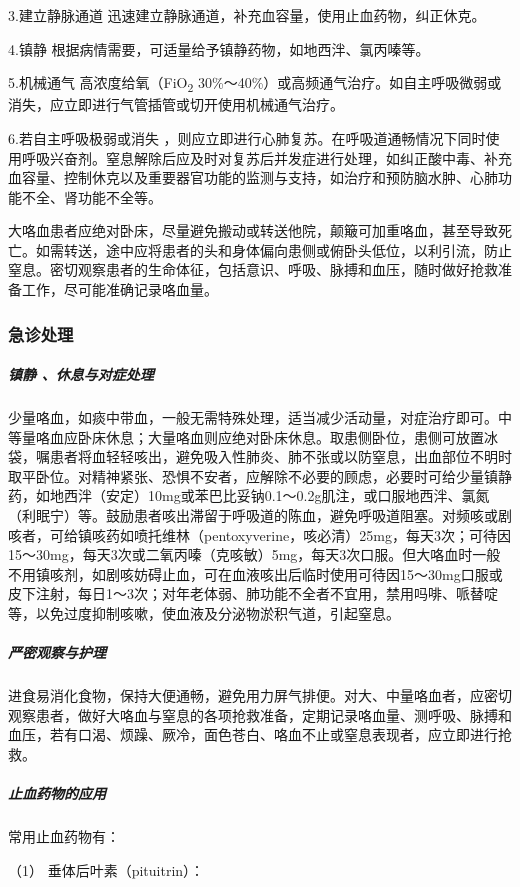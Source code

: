 3.建立静脉通道 迅速建立静脉通道，补充血容量，使用止血药物，纠正休克。

4.镇静 根据病情需要，可适量给予镇静药物，如地西泮、氯丙嗪等。

5.机械通气 高浓度给氧（FiO\textsubscript{2}
30\%～40\%）或高频通气治疗。如自主呼吸微弱或消失，应立即进行气管插管或切开使用机械通气治疗。

6.若自主呼吸极弱或消失
，则应立即进行心肺复苏。在呼吸道通畅情况下同时使用呼吸兴奋剂。窒息解除后应及时对复苏后并发症进行处理，如纠正酸中毒、补充血容量、控制休克以及重要器官功能的监测与支持，如治疗和预防脑水肿、心肺功能不全、肾功能不全等。

大咯血患者应绝对卧床，尽量避免搬动或转送他院，颠簸可加重咯血，甚至导致死亡。如需转送，途中应将患者的头和身体偏向患侧或俯卧头低位，以利引流，防止窒息。密切观察患者的生命体征，包括意识、呼吸、脉搏和血压，随时做好抢救准备工作，尽可能准确记录咯血量。

\subsubsection{急诊处理}

\subparagraph{镇静 、休息与对症处理}

少量咯血，如痰中带血，一般无需特殊处理，适当减少活动量，对症治疗即可。中等量咯血应卧床休息；大量咯血则应绝对卧床休息。取患侧卧位，患侧可放置冰袋，嘱患者将血轻轻咳出，避免吸入性肺炎、肺不张或以防窒息，出血部位不明时取平卧位。对精神紧张、恐惧不安者，应解除不必要的顾虑，必要时可给少量镇静药，如地西泮（安定）10mg或苯巴比妥钠0.1～0.2g肌注，或口服地西泮、氯氮{}
（利眠宁）等。鼓励患者咳出滞留于呼吸道的陈血，避免呼吸道阻塞。对频咳或剧咳者，可给镇咳药如喷托维林（pentoxyverine，咳必清）25mg，每天3次；可待因15～30mg，每天3次或二氧丙嗪（克咳敏）5mg，每天3次口服。但大咯血时一般不用镇咳剂，如剧咳妨碍止血，可在血液咳出后临时使用可待因15～30mg口服或皮下注射，每日1～3次；对年老体弱、肺功能不全者不宜用，禁用吗啡、哌替啶等，以免过度抑制咳嗽，使血液及分泌物淤积气道，引起窒息。

\subparagraph{严密观察与护理}

进食易消化食物，保持大便通畅，避免用力屏气排便。对大、中量咯血者，应密切观察患者，做好大咯血与窒息的各项抢救准备，定期记录咯血量、测呼吸、脉搏和血压，若有口渴、烦躁、厥冷，面色苍白、咯血不止或窒息表现者，应立即进行抢救。

\subparagraph{止血药物的应用}

常用止血药物有：

\hypertarget{text00024.htmlux5cux23CHP1-9-4-2-3-1}{}
（1） 垂体后叶素（pituitrin）：

